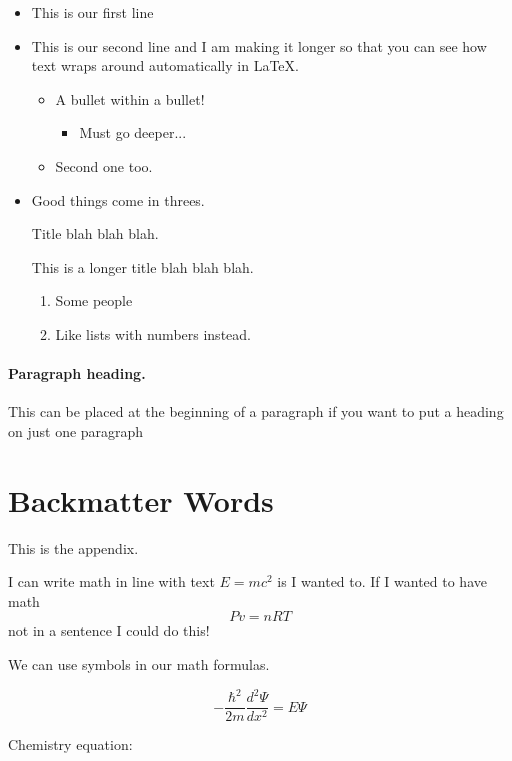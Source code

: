 \documentclass{article}
\begin{document}
\begin{itemize}
	\item This is our first line
	\item This is our second line and I am making it longer so that you can see how text wraps around automatically in \LaTeX{}.
	\begin{itemize}
		\item A bullet within a bullet!
			\begin{itemize}
				\item Must go deeper...
			\end{itemize}
		\item Second one too.
	\end{itemize}
	\item Good things come in threes.
	\item [Title] blah blah blah.
	\item[This is a longer title] blah blah blah.
	\begin{enumerate}
		\item Some people
		\item Like lists with numbers instead.
	\end{enumerate}
\end{itemize}

\paragraph{Paragraph heading.}
This can be placed at the beginning of a paragraph
if you want to put a heading on just one paragraph

\cleardoublepage


\cleardoublepage

\appendix
\section{Backmatter Words}
This is the appendix.

I can write math in line with text $E=mc^2$ is I wanted to. If I wanted to have math $$Pv = nRT$$ not in a sentence I could do this!

We can use symbols in our math formulas.

$$-\frac{\hbar^2}{2m} \frac{d^2\Psi}{dx^2} = E\Psi$$

Chemistry equation:

\end{document}
